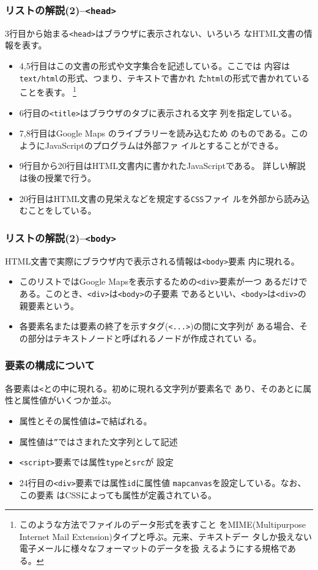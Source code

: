 \documentclass[dvipsk]{beamer}
\newcommand{\Elm}[1]{\texttt{<#1>}}
\begin{document}
\begin{frame}[containsverbatim]
 \frametitle{リストの解説(2)--\texttt{<head>}}
3行目から始まる\Elm{head}はブラウザに表示されない、いろいろ
       なHTML文書の情報を表す。
 \begin{itemize}
  \item 4,5行目はこの文書の形式や文字集合を記述している。ここでは
	内容は\texttt{text/html}の形式、つまり、テキストで書かれ
	た\texttt{html}の形式で書かれていることを表す。
	\footnote{このような方法でファイルのデータ形式を表すこと
	をMIME(Multipurpose
	Internet Mail Extension)タイプと呼ぶ。元来、テキストデー
	タしか扱えない電子メールに様々なフォーマットのデータを扱
	えるようにする規格である。}
  \item 6行目の\Elm{title}はブラウザのタブに表示される文字
	列を指定している。
  \item 7,8行目はGoogle Maps のライブラリーを読み込むため
	のものである。このようにJavaScriptのプログラムは外部ファ
	イルとすることができる。
  \item 9行目から20行目はHTML文書内に書かれたJavaScriptである。
	詳しい解説は後の授業で行う。
  \item 20行目はHTML文書の見栄えなどを規定する\texttt{CSS}ファイ
	ルを外部から読み込むことをしている。
 \end{itemize}
\end{frame}
\begin{frame}[containsverbatim]
 \frametitle{リストの解説(2)--\texttt{<body>}}
HTML文書で実際にブラウザ内で表示される情報は\Elm{body}要素
       内に現れる。
\begin{itemize}
 \item このリストではGoogle Mapsを表示するための\Elm{div}要素が一つ
       あるだけである。このとき、\Elm{div}は\Elm{body}の子要素
       であるといい、\Elm{body}は\Elm{div}の親要素という。
 \item 各要素名または要素の終了を示すタグ(\texttt{<...>})の間に文字列が
       ある場合、その部分はテキストノードと呼ばれるノードが作成されてい
       る。
\end{itemize}
\end{frame}
\begin{frame}[containsverbatim]
 \frametitle{要素の構成について}
各要素は\texttt{<}と\texttt{}の中に現れる。初めに現れる文字列が要素名で
 あり、そのあとに属性と属性値がいくつか並ぶ。
\begin{itemize}
 \item 属性とその属性値は\texttt{=}で結ばれる。
 \item 属性値は\texttt{”}ではさまれた文字列として記述
 \item \Elm{script}要素では属性\texttt{type}と\texttt{src}が
       設定
 \item 24行目の\Elm{div}要素では属性\texttt{id}に属性値
       \texttt{map\textunderscore canvas}を設定している。なお、この要素
       はCSSによっても属性が定義されている。
\end{itemize}
\end{frame}
\end{document}
